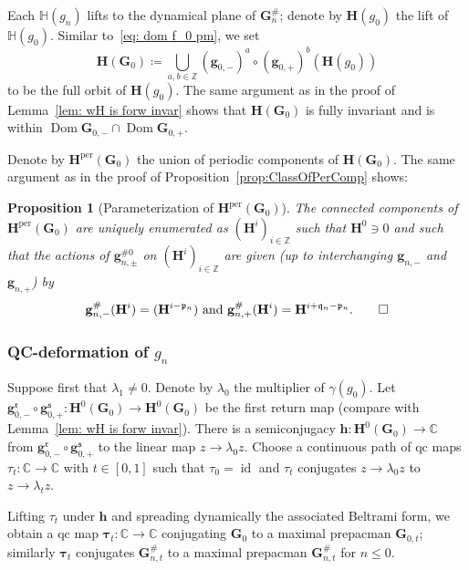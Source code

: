 \documentclass[]{amsart}
\newcommand{\Dom}{\operatorname {Dom}}
\newcommand{\bH}{{\mathbf H}}
\newcommand{\bG}{{\mathbf G}}
\newcommand{\fH}{{\mathbb H}}
\newcommand{\bbh}{{\mathbf h}}
\newcommand{\btau}{{ \boldsymbol {\tau}}}%
\newcommand{\bbg}{{\mathbf g}}
\newcommand{\pp}{\mathfrak{p}}
\renewcommand{\qq}{\mathfrak{q}}
\newcommand{\rr}{\mathfrak{r}}
\renewcommand{\ss}{\mathfrak{s}}
\newcommand{\C}{\mathbb{C}}
\newcommand{\Z}{\mathbb{Z}}
\newtheorem{prop}[thm]{Proposition}
\theoremstyle{remark}
\numberwithin{equation}{section}
\theoremstyle{definition}
\newcommand{\per}{{\mathrm{per}}}
\newcommand{\id}{\operatorname{id}}
\begin{document}
 Each $\fH(g_n)$ lifts to the dynamical plane of $\bG^{\#}_n$; denote by $\bH (g_0)$ the lift of  $\fH(g_0)$.  Similar to~\eqref{eq: dom f_0 pm}, we set 
\[\bH(\bG_0)\coloneqq \bigcup_{a,b\in \Z} (\bbg_{0,-})^a\circ (\bbg_{0,+})^{b} \left(\bH(g_0) \right)\]
 to be the full orbit of $\bH(g_0)$. The same argument as in the proof of Lemma~\ref{lem: wH is forw invar} shows that $\bH(\bG_0)$ is fully invariant and is within $\Dom \bG_{0,-} \cap \Dom \bG_{0,+} $. 
 
  Denote by $\bH^\per(\bG_0)$ the union of periodic components of $\bH(\bG_0)$. The same argument as in the proof of Proposition~\ref{prop:ClassOfPerComp} shows:
 \begin{prop}[Parameterization of $\bH^\per(\bG_0)$]
The connected components of $\bH^\per(\bG_0)$ 
are uniquely enumerated as $(\bH^i)_{i\in \Z}$ such that $\bH^0\ni 0$ and such that the actions of $\bbg^{\#0}_{n,\pm}$ on $(\bH^i)_{i\in \Z}$ are given (up to interchanging $\bbg_{n,-}$ and $\bbg_{n,+}$) by
\begin{equation}
 \bbg^{\#}_{n,-}(\bH^i) = ( \bH^{i-\pp_n}) \text{ and } \bbg^{\#}_{n,+}(\bH^i) = \bH^{i+\qq_n-\pp_n}. \qed
\end{equation}
\end{prop}

 \subsubsection{QC-deformation of $g_n$}
 \label{ss:ScalThm:QC-deform}
Suppose first that $\lambda_1\not= 0$. Denote by $\lambda_0$ the multiplier of $ \gamma(g_0)$. Let $\bbg_{0,-}^\rr\circ \bbg_{0,+}^\ss\colon \bH^0(\bG_0)\to \bH^0(\bG_0)$ be the first return map (compare with Lemma~\ref{lem: wH is forw invar}). There is a semiconjugacy $\bbh\colon \bH^0(\bG_0) \to \C$ from $\bbg_{0,-}^\rr\circ \bbg_{0,+}^\ss$ to the linear map $z\to \lambda_0 z$. Choose a continuous path of qc maps $\tau_t\colon \C\to \C$ with $t\in  [0,1]$ such that $\tau_0=\id$ and  $\tau_t$ conjugates $z\to \lambda_0z$ to $z\to \lambda_t z$.

Lifting $\tau_t$ under $\bbh$ and spreading dynamically the associated Beltrami form, we obtain a qc map $\btau_t\colon \C\to \C$ conjugating $\bG_0$ to a maximal prepacman $\bG_{0,t}$; similarly $\btau_t$ conjugates $\bG^\#_{n,t}$ to a maximal prepacman $\bG^\#_{n,t}$ for $n\le 0$. 
\end{document}
